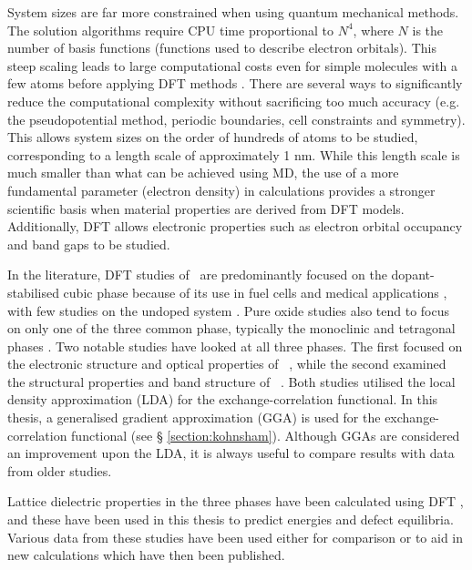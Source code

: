 System sizes are far more constrained when using quantum mechanical methods. The solution algorithms require CPU time proportional to $N^4$, where $N$ is the number of basis functions (functions used to describe electron orbitals). This steep scaling leads to large computational costs even for simple molecules with a few atoms before applying DFT methods \cite{Challacombe1997, Schwegler1996}. There are several ways to significantly reduce the computational complexity without sacrificing too much accuracy (e.g. the pseudopotential method, periodic boundaries, cell constraints and symmetry). This allows system sizes on the order of hundreds of atoms to be studied, corresponding to a length scale of approximately 1 nm. While this length scale is much smaller than what can be achieved using MD, the use of a more fundamental parameter (electron density) in calculations provides a stronger scientific basis when material properties are derived from DFT models. Additionally, DFT allows electronic properties such as electron orbital occupancy and band gaps to be studied.

In the literature, DFT studies of \zirconia\ are predominantly focused on the dopant-stabilised cubic phase because of its use in fuel cells and medical applications \cite{orera1990intrinsic,jiang2011first}, with few studies on the undoped system \cite{mackrodt1986theoretical,aarhammar2009energetics}. Pure oxide studies also tend to focus on only one of the three common phase, typically the monoclinic \cite{zheng2007first,foster2002modelling,foster2001structure} and tetragonal phases \cite{Gionco2013, Eichler2004, Zhang2014}. Two notable studies have looked at all three phases. The first focused on the electronic structure and optical properties of \zirconia\ \cite{French1994}, while the second examined the structural properties and band structure of \zirconia\ \cite{Kralik1998}. Both studies utilised the local density approximation (LDA) for the exchange-correlation functional. In this thesis, a generalised gradient approximation (GGA) is used for the exchange-correlation functional (see § \ref{section:kohnsham}). Although GGAs are considered an improvement upon the LDA, it is always useful to compare results with data from older studies. 


Lattice dielectric properties in the three phases have been calculated using DFT \cite{Zhao2002a}, and these have been used in this thesis to predict energies and defect equilibria. Various data from these studies have been used either for comparison or to aid in new calculations which have then been published.

